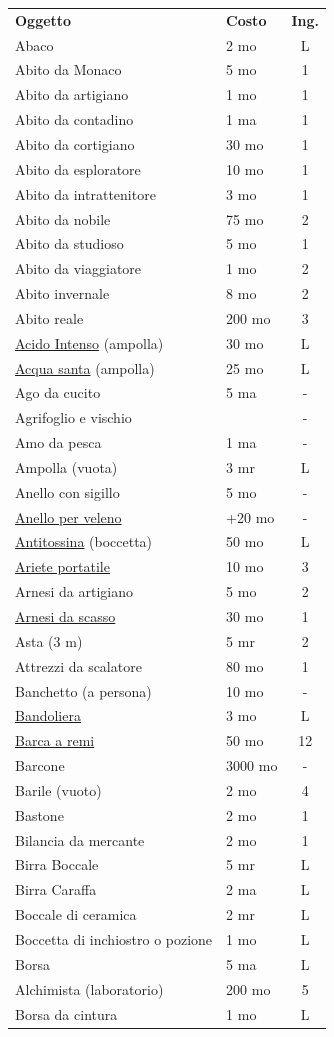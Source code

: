 \begin{multicols}{2}
\noindent\begin{tabular}{llc}\label{equipaggiamentolista}
\textbf{Oggetto}& \textbf{Costo} & \textbf{Ing.}\\
Abaco&2 mo&L\\
Abito da Monaco & 5 mo& 1\\
Abito da artigiano& 1 mo& 1\\
Abito da contadino& 1 ma& 1\\
Abito da cortigiano& 30 mo& 1\\
Abito da esploratore& 10 mo& 1\\
Abito da intrattenitore & 3 mo& 1\\
Abito da nobile & 75 mo& 2\\
Abito da studioso & 5 mo& 1\\
Abito da viaggiatore& 1 mo& 2\\
Abito invernale & 8 mo& 2\\
Abito reale & 200 mo & 3\\
\hyperlink{Acido Intenso}{Acido Intenso} (ampolla) & 30 mo& L \\
\hyperlink{Acqua santa}{Acqua santa} (ampolla) & 25 mo& L\\
Ago da cucito & 5 ma &- \\
Agrifoglio e vischio & & -\\
Amo da pesca & 1 ma & - \\
Ampolla (vuota) & 3 mr & L \\
Anello con sigillo& 5 mo& - \\
\hyperlink{Anello per veleno}{Anello per veleno} & +20 mo&-\\
\hyperlink{Antitossina}{Antitossina} (boccetta)& 50 mo& L\\
\hyperlink{Ariete portatile}{Ariete portatile}& 10 mo& 3 \\
Arnesi da artigiano& 5 mo& 2\\
\hyperlink{Attrezzi da scasso}{Arnesi da scasso}& 30 mo& 1\\
Asta (3 m)& 5 mr& 2\\
Attrezzi da scalatore & 80 mo& 1\\
Banchetto (a persona) & 10 mo& -\\
\hyperlink{Bandoliera}{Bandoliera} & 3 mo & L\\
\hyperlink{Barca a remi}{Barca a remi}& 50 mo& 12\\
Barcone & 3000 mo& -\\
Barile (vuoto)& 2 mo& 4\\
Bastone & 2 mo& 1\\
Bilancia da mercante& 2 mo& 1\\
Birra Boccale& 5 mr& L\\
Birra Caraffa & 2 ma & L\\
Boccale di ceramica & 2 mr & L \\
Boccetta di inchiostro o pozione & 1 mo & L\\
Borsa & 5 ma & L \\
Alchimista (laboratorio) & 200 mo & 5 \\
Borsa da cintura & 1 mo & L \\
\end{tabular}


\end{multicols}
